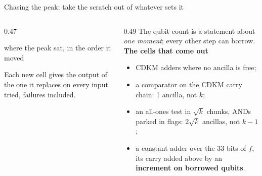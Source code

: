 \documentclass[aspectratio=169,11pt]{beamer}
\newcommand{\blocktitle}[1]{{\bfseries #1}\par\vskip1mm}
\begin{document}
\begin{frame}{Chasing the peak: take the scratch out of whatever sets it}
  \begin{columns}[T]
    \begin{column}{0.47\textwidth}
      \centering
      \par
      {\scriptsize where the peak sat, in the order it moved}\par
      \vskip3mm
      \raggedright{\small Each new cell gives the output of the one it replaces on every input tried, failures included.}
    \end{column}
    \begin{column}{0.49\textwidth}
      \small The qubit count is a statement about \emph{one moment}; every other step can borrow.
      \vskip2mm
      \blocktitle{The cells that come out}
      \begin{itemize}\setlength{\itemsep}{0.6mm}
        \item CDKM adders where no ancilla is free;
        \item a comparator on the CDKM carry chain: 1 ancilla, not $k$;
        \item an all-ones test in $\sqrt k$ chunks, ANDs parked in flags: $2\sqrt k$ ancillas, not $k-1$;
        \item a constant adder over the 33 bits of $f$, its carry added above by an \textbf{increment on borrowed qubits}.
      \end{itemize}
    \end{column}
  \end{columns}
\end{frame}
\end{document}
